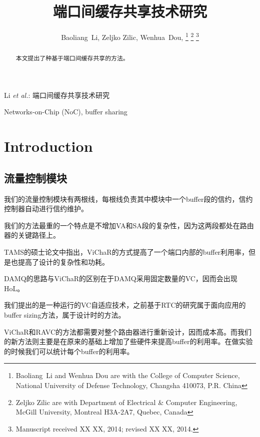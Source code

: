 \documentclass[10pt,journal]{IEEEtran}
\begin{document}
\title{端口间缓存共享技术研究}

\author{Baoliang~Li, %
        Zeljko Zilic, %
        Wenhua~Dou, %
\thanks{Baoliang~Li and Wenhua Dou are with the College of Computer Science, National University of Defense Technology, Changsha 410073, P.R. China}%
\thanks{Zeljko Zilic are with Department of Electrical \& Computer Engineering, McGill University, Montreal H3A-2A7, Quebec, Canada}%
\thanks{Manuscript received XX XX, 2014; revised XX XX, 2014.}}

%
{Li \MakeLowercase{\textit{et al.}}: 端口间缓存共享技术研究}

\maketitle

\begin{abstract}
本文提出了种基于端口间缓存共享的方法。
\end{abstract}
\begin{IEEEkeywords}
Networks-on-Chip (NoC), buffer sharing
\end{IEEEkeywords}

\section{Introduction}
\subsection{流量控制模块}
我们的流量控制模块有两根线，每根线负责其中模块中一个buffer段的信约，信约控制器自动进行信约维护。

我们的方法最重的一个特点是不增加VA和SA段的复杂性，因为这两段都处在路由器的关键路径上。

TAMS的硕士论文中指出，ViChaR的方式提高了一个端口内部的buffer利用率，但是也提高了设计的复杂性和功耗。

DAMQ的思路与ViChaR的区别在于DAMQ采用固定数量的VC，因而会出现HoL。

我们提出的是一种运行的VC自适应技术，之前基于RTC的研究属于面向应用的buffer sizing方法，属于设计时的方法。

ViChaR和RAVC的方法都需要对整个路由器进行重新设计，因而成本高。而我们的新方法则主要是在原来的基础上增加了些硬件来提高buffer的利用率。在做实验的时候我们可以统计每个buffer的利用率。
\end{document}
